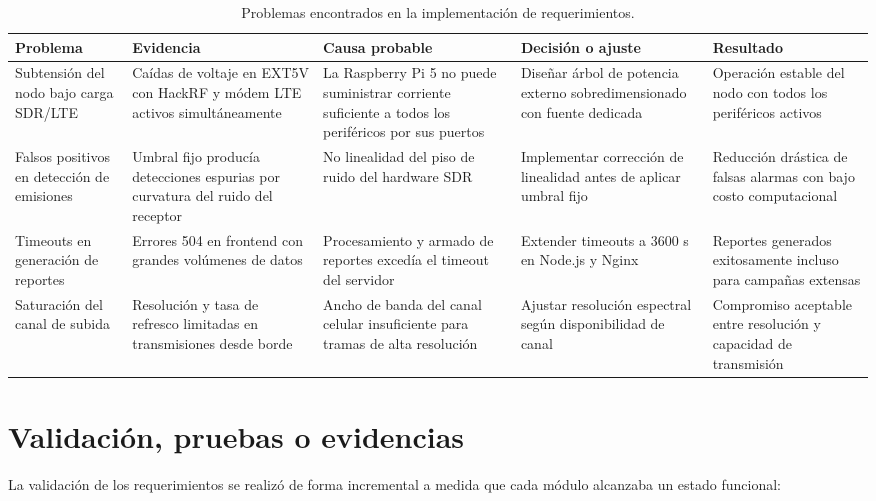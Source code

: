 \begin{table}[H]
\centering
\caption{Problemas encontrados en la implementación de requerimientos.}
\label{tab:req_problemas}
\begin{tabularx}{\textwidth}{@{}p{2.5cm} p{2.2cm} p{2.5cm} p{2.8cm} X@{}}
\toprule
Problema & Evidencia & Causa probable & Decisión o ajuste & Resultado \\
\midrule
Subtensión del nodo bajo carga SDR/LTE & Caídas de voltaje en EXT5V con HackRF y módem LTE activos simultáneamente & La Raspberry Pi 5 no puede suministrar corriente suficiente a todos los periféricos por sus puertos & Diseñar árbol de potencia externo sobredimensionado con fuente dedicada & Operación estable del nodo con todos los periféricos activos \\
Falsos positivos en detección de emisiones & Umbral fijo producía detecciones espurias por curvatura del ruido del receptor & No linealidad del piso de ruido del hardware SDR & Implementar corrección de linealidad antes de aplicar umbral fijo & Reducción drástica de falsas alarmas con bajo costo computacional \\
Timeouts en generación de reportes & Errores 504 en frontend con grandes volúmenes de datos & Procesamiento y armado de reportes excedía el timeout del servidor & Extender timeouts a 3600 s en Node.js y Nginx & Reportes generados exitosamente incluso para campañas extensas \\
Saturación del canal de subida & Resolución y tasa de refresco limitadas en transmisiones desde borde & Ancho de banda del canal celular insuficiente para tramas de alta resolución & Ajustar resolución espectral según disponibilidad de canal & Compromiso aceptable entre resolución y capacidad de transmisión \\
\bottomrule
\end{tabularx}
\end{table}

\section{Validación, pruebas o evidencias}

La validación de los requerimientos se realizó de forma incremental a medida que cada módulo alcanzaba un estado funcional:

